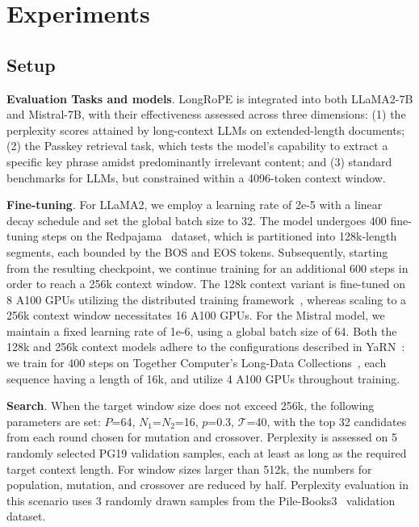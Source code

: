  \section{Experiments}

\label{sec:exp}
\subsection{Setup}
\textbf{Evaluation Tasks and models}. LongRoPE is integrated into both LLaMA2-7B and Mistral-7B, with their effectiveness assessed across three dimensions: (1) the perplexity scores attained by long-context LLMs on extended-length documents; (2) the Passkey retrieval task, which tests the model’s capability to extract a specific key phrase amidst predominantly irrelevant content; and (3) standard benchmarks for LLMs, but constrained within a 4096-token context window.

\textbf{Fine-tuning}. For LLaMA2, we employ a learning rate of 2e-5 with a linear decay schedule and set the global batch size to 32. The model undergoes 400 fine-tuning steps on the Redpajama~\cite{redpajama} dataset, which is partitioned into 128k-length segments, each bounded by the BOS and EOS tokens. Subsequently, starting from the resulting checkpoint, we continue training for an additional 600 steps in order to reach a 256k context window. The 128k context variant is fine-tuned on 8 A100 GPUs utilizing the distributed training framework~\cite{cube}, whereas scaling to a 256k context window necessitates 16 A100 GPUs. For the Mistral model, we maintain a fixed learning rate of 1e-6, using a global batch size of 64. Both the 128k and 256k context models adhere to the configurations described in YaRN~\cite{yarn}: we train for 400 steps on Together Computer's Long-Data Collections~\cite{mistraldata}, each sequence having a length of 16k, and utilize 4 A100 GPUs throughout training.

\textbf{Search}. When the target window size does not exceed 256k, the following parameters are set: $P$=64, $N_1$=$N_2$=16, $p$=0.3, $\mathcal{T}$=40, with the top 32 candidates from each round chosen for mutation and crossover. Perplexity is assessed on 5 randomly selected PG19 validation samples, each at least as long as the required target context length. For window sizes larger than 512k, the numbers for population, mutation, and crossover are reduced by half. Perplexity evaluation in this scenario uses 3 randomly drawn samples from the Pile-Books3~\cite{pile} validation dataset.

